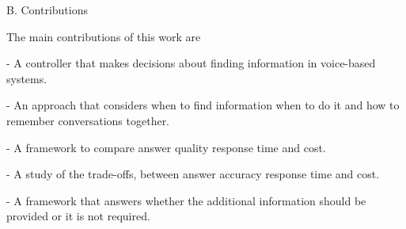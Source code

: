 B. Contributions

The main contributions of this work are

- A controller that makes decisions about finding information in voice-based systems.

- An approach that considers when to find information when to do it and how to remember conversations together.

- A framework to compare answer quality response time and cost.

- A study of the trade-offs, between answer accuracy response time and cost.

- A framework that answers whether the additional information should be provided or it is not required.
